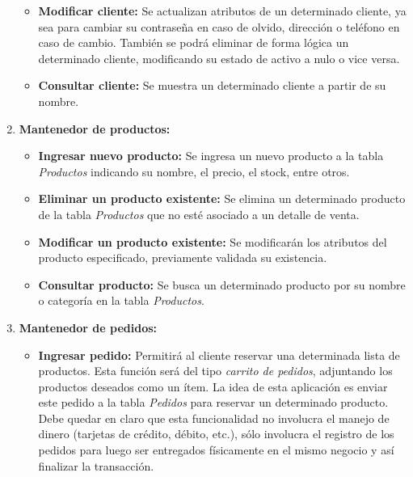 \documentclass[letterpaper,12pt]{article}
\begin{document}
\begin{enumerate}
\begin{itemize}
\item \textbf{Modificar cliente: }
Se actualizan atributos de un determinado cliente, ya sea para cambiar su contraseña en caso de olvido, dirección o 
teléfono en caso de cambio. También se podrá eliminar de forma lógica un determinado cliente, modificando su estado de activo a nulo o vice versa.

\item \textbf{Consultar cliente: }
Se muestra un determinado cliente a partir de su nombre.
\end{itemize}

\item \textbf{Mantenedor de productos:}

\begin{itemize}
\item \textbf{Ingresar nuevo producto: }
Se ingresa un nuevo producto a la tabla \emph{Productos} indicando su nombre, el precio, el stock, entre otros.

\item \textbf{Eliminar un producto existente: }
Se elimina un determinado producto de la tabla \emph{Productos} que no esté asociado a un detalle de venta.

\item \textbf{Modificar un producto existente: }
Se modificarán los atributos del producto especificado, previamente validada su existencia.

\item \textbf{Consultar producto: }
Se busca un determinado producto por su nombre o categoría en la tabla \emph{Productos}.
\end{itemize}

\newpage

\item \textbf{Mantenedor de pedidos:} 

\begin{itemize}
\item \textbf{Ingresar pedido:}
Permitirá al cliente reservar una determinada lista de productos. Esta función será del tipo \emph{carrito de pedidos}, adjuntando los productos deseados como un ítem. La idea de esta aplicación es enviar este pedido a la tabla \emph{Pedidos} para reservar un determinado producto. Debe quedar en claro que esta funcionalidad no involucra el manejo de dinero (tarjetas de crédito, débito, etc.), sólo involucra el registro de los pedidos para luego ser entregados físicamente en el mismo negocio y así finalizar la transacción.     


\end{itemize}
\end{enumerate}
\end{document}
